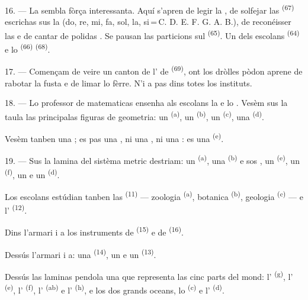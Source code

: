16. --- La  sembla fòrça interessanta. Aquí s'apren de
legir la , de solfejar las 
\textsuperscript{(67)} escrichas sus la  (do, re, mi, fa, sol, la,
si\,=\,C. D. E. F. G. A. B.), de reconéisser las  e de cantar de
polidas . Se pausan las particions sul 
\textsuperscript{(65)}. Un dels escolans 
\textsuperscript{(64)} e lo  \textsuperscript{(66)}
 \textsuperscript{(68)}.

17. --- Començam de veire un canton de l' de  \textsuperscript{(69)}, ont los dròlles pòdon aprene de rabotar la fusta
e de limar lo fèrre. N'i a pas dins totes los instituts.

\VUsaut{5.0mm}
\VUsaut{3.6mm}

18. --- Lo professor de matematicas ensenha als escolans la  e lo . Vesèm sus la taula las
principalas figuras de geometria: un  \textsuperscript{(a)}, un
 \textsuperscript{(b)}, un 
\textsuperscript{(c)}, una  \textsuperscript{(d)}.

Vesèm tanben una ; es pas una , ni una
, ni una : es una 
\textsuperscript{(e)}.

19. --- Sus la lamina del sistèma metric destriam: un 
\textsuperscript{(a)}, una  \textsuperscript{(b)} e sos
, un  \textsuperscript{(e)}, un 
\textsuperscript{(f)}, un  e un 
\textsuperscript{(d)}.

Los escolans estúdian tanben las 
\textsuperscript{(11)} --- zoologia \textsuperscript{(a)}, botanica
\textsuperscript{(b)}, geologia \textsuperscript{(c)} --- e l'
\textsuperscript{(12)}.

Dins l'armari i a los instruments de  \textsuperscript{(15)} e de
 \textsuperscript{(16)}.

Dessús l'armari i a: una  \textsuperscript{(14)}, un 
e un  \textsuperscript{(13)}.

Dessús las laminas pendola una  que representa las cinc parts del
mond: l' \textsuperscript{(g)}, l'
\textsuperscript{(e)}, l' \textsuperscript{(f)},
l' \textsuperscript{(ab)} e l'
\textsuperscript{(h)}, e los dos grands oceans, lo 
\textsuperscript{(c)} e l' \textsuperscript{(d)}.
\VUsaut{6.0mm}
\VUfilet{22mm}
